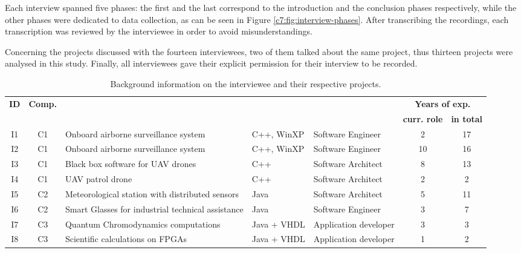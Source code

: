 Each interview spanned five phases: the first and the last correspond to the introduction and the conclusion phases respectively, while the other phases were dedicated to data collection, as can be seen in Figure \ref{c7:fig:interview-phases}.
After transcribing the recordings, each transcription was reviewed by the interviewee in order to avoid misunderstandings.

Concerning the projects discussed with the fourteen interviewees, two of them talked about the same project, thus thirteen projects were analysed in this study.
Finally, all interviewees gave their explicit permission for their interview to be recorded.

\begin{table}[tbp]
    \footnotesize
    \centering
    \caption{Background information on the interviewee and their respective projects.}
    \label{c7:tab:iw-participants-background}
    \begin{tabular}{@{}cc>{\centering\arraybackslash}m{2.5cm}>{\centering\arraybackslash}m{1.5cm}>{\centering\arraybackslash}m{1.5cm}cc@{}}
        \toprule
        \multirow{2}{*}{\bfseries ID} & \multirow{2}{*}{\bfseries Comp.} & \multirow{2}{*}{\bfseries Project} & \multirow{2}{*}{\bfseries Platform} &\multirow{2}{*}{\shortstack{\bfseries Role in \\ \bfseries the comp.}} & \multicolumn{2}{c}{\bfseries Years of exp.} \\
        &  &  &  &  &\multicolumn{1}{c|}{\bfseries curr. role} & \textbf{in total} \\ \midrule
        I1 & C1 & Onboard airborne surveillance system & C++, WinXP  & Software Engineer & 2 & 17 \\
        I2 & C1 & Onboard airborne surveillance system & C++, WinXP  & Software Engineer & 10 & 16 \\
        I3 & C1 & Black box software for UAV drones & C++  & Software Architect & 8 & 13 \\
        I4 & C1 & UAV patrol drone & C++  & Software Architect & 2 & 2\\
        I5 & C2 & Meteorological station with distributed sensors & Java  & Software Architect & 5 & 11 \\
        I6 & C2 & Smart Glasses for industrial technical assistance & Java & Software Engineer & 3 & 7 \\
        I7 & C3 & Quantum Chromodynamics computations & Java + VHDL & Application developer & 3 & 3 \\
        I8 & C3 & Scientific calculations on FPGAs & Java + VHDL & Application developer & 1 & 2 \\

\end{tabular}
\end{table}
